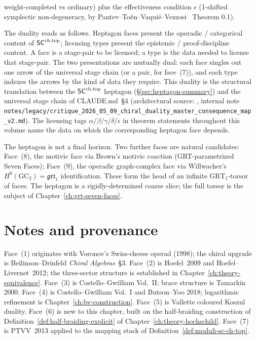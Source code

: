 \begin{remark}
\begin{enumerate}[label=\textup{(\arabic*)}]
weight-completed vs ordinary) plus the effectiveness condition
$\epsilon$ (1-shifted symplectic non-degeneracy, by
Pantev--To{\"e}n--Vaqui{\'e}--Vezzosi~\cite{PTVV13} Theorem 0.1).
\end{enumerate}
The duality reads as follows. Heptagon faces present the operadic
/ categorical content of $\mathsf{SC}^{\mathrm{ch},\mathrm{top}}$; licensing types present the
epistemic / proof-discipline content. A face is a stage-pair to be
licensed; a type is the data needed to license that stage-pair.
The two presentations are mutually dual: each face singles out one
arrow of the universal stage chain (or a pair, for face~(7)), and
each type indexes the arrows by the kind of data they require.
This duality is the structural translation between
the $\mathsf{SC}^{\mathrm{ch},\mathrm{top}}$ heptagon (\S\ref{sec:heptagon-summary}) and the
universal stage chain of CLAUDE.md~\S4 (architectural source:
\cite[\S4]{Critique20260509v2}, internal note
\texttt{notes/legacy/critique\_2026\_05\_09\_chiral\_duality\_master\_consequence\_map\_v2.md}).
The licensing tags $\alpha / \beta / \gamma / \delta / \epsilon$
in theorem statements throughout this volume name the data on
which the corresponding heptagon face depends.
\end{remark}

\begin{remark}\label{rem:heptagon-beyond}
The heptagon is not a final horizon. Two further faces are natural
candidates: Face~(8), the motivic face via Brown's motivic coaction
(GRT-parametrized Seven Faces); Face~(9),
the operadic graph-complex face via Willwacher's
$H^0(\mathrm{GC}_2)=\mathfrak{grt}_1$ identification. These form
the head of an infinite $\mathrm{GRT}_1$-torsor of faces. The
heptagon is a rigidly-determined coarse slice; the full torsor is
the subject of Chapter~\ref{ch:grt-seven-faces}.
\end{remark}

\section*{Notes and provenance}

Face~(1) originates with Voronov's Swiss-cheese operad (1998); the
chiral upgrade is Beilinson--Drinfeld \textit{Chiral Algebras}~\S3.
Face~(2) is Hoefel~2009 and Hoefel--Livernet~2012; the three-sector
structure is established in Chapter~\ref{ch:theory-equivalence}.
Face~(3) is Costello--Gwilliam Vol.~II; brace structure is Tamarkin
2000. Face~(4) is Costello--Gwilliam Vol.~I and Butson--Yoo 2018;
logarithmic refinement is Chapter~\ref{ch:bv-construction}. Face~(5)
is Vallette coloured Koszul duality. Face~(6) is new to this chapter,
built on the half-braiding construction of
Definition~\ref{def:half-braiding-explicit} of
Chapter~\ref{ch:theory-hochschild}. Face~(7) is
PTVV~2013 applied to the mapping stack of
Definition~\ref{def:moduli-sc-ch-top}.

